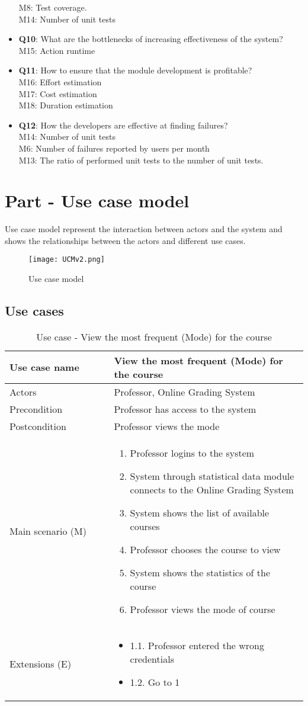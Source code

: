 \documentclass[12pt]{article}
\newcommand\tabularhead[1]{
\begin{table}[h]
  \caption{Use case - #1}
  \begin{tabular}{|p{0.35\linewidth}|p{0.65\linewidth}|}
    \hline
    \textbf{Use case name} & \textbf{#1} \\
    \hline}
\newcommand\addrow[2]{#1 &#2\\ \hline}
\newcommand\adddoublerow[2]{\begin{minipage}[t][][t]{2.5cm}#1\end{minipage}%
    &\begin{minipage}[t][][t]{\linewidth}
     \begin{itemize}\setlength{\itemsep}{0pt}%
        #2     
     \end{itemize}
     \end{minipage}\\ \hline}
\newcommand\addmulrow[2]{ \begin{minipage}[t][][t]{2.5cm}#1\end{minipage}%
     &\begin{minipage}[t][][t]{\linewidth}
      \begin{enumerate}\setlength{\itemsep}{0pt}%
        #2   
      \end{enumerate}
      \end{minipage}\\ \hline}
\newenvironment{usecase}{\tabularhead}
{\hline\end{tabular}\end{table}}
\begin{document}
\begin{itemize}
     M8: Test coverage.\\
     M14: Number of unit tests 
    \item \textbf{Q10}: What are the bottlenecks of increasing effectiveness of the system?\\
     M15: Action runtime
    \item \textbf{Q11}: How to ensure that the module development is profitable?\\
     M16: Effort estimation\\
     M17: Cost estimation\\
     M18: Duration estimation
    \item \textbf{Q12}: How the developers are effective at finding failures?\\
     M14: Number of unit tests\\
     M6: Number of failures reported by users per month\\
     M13: The ratio of performed unit tests to the number of unit tests. 
\end{itemize}
\newpage
\section{Part - Use case model}
Use case model represent the interaction between actors and the system and shows the relationships between the actors and different use cases.\cite{UCM}
\begin{figure}[h]
\centering
\texttt{[image: UCMv2.png]}
\caption{Use case model}
\end{figure}
\newpage
\subsection{Use cases}

\begin{usecase}{View the most frequent (Mode) for the course}
    \addrow{Actors}{Professor, Online Grading System}
    \addrow{Precondition}{Professor has access to the system}
    \addrow{Postcondition}{Professor views the mode}
    \addmulrow{Main scenario (M)}{
        \item Professor logins to the system
        \item System through statistical data module connects to the Online Grading System
        \item System shows the list of available courses
        \item Professor chooses the course to view
        \item System shows the statistics of the course
        \item Professor views the mode of course
    }
    \adddoublerow{Extensions (E)}{
        \item[] 1.1. Professor entered the wrong credentials
        \item[] 1.2. Go to 1
    }
\end{usecase}
\end{document}
